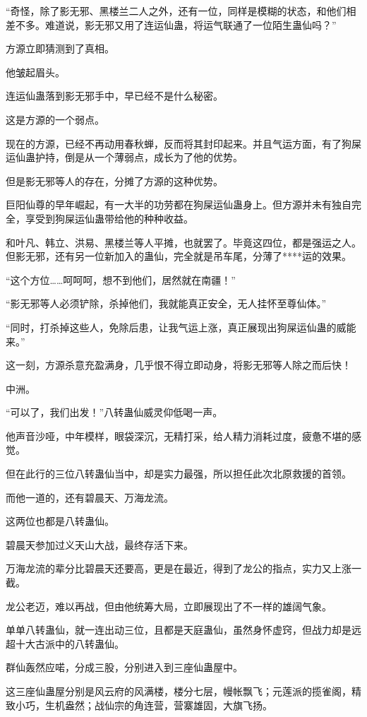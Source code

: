 \begin{this_body}
“奇怪，除了影无邪、黑楼兰二人之外，还有一位，同样是模糊的状态，和他们相差不多。难道说，影无邪又用了连运仙蛊，将运气联通了一位陌生蛊仙吗？”

方源立即猜测到了真相。

他皱起眉头。

连运仙蛊落到影无邪手中，早已经不是什么秘密。

这是方源的一个弱点。

现在的方源，已经不再动用春秋蝉，反而将其封印起来。并且气运方面，有了狗屎运仙蛊护持，倒是从一个薄弱点，成长为了他的优势。

但是影无邪等人的存在，分摊了方源的这种优势。

巨阳仙尊的早年崛起，有一大半的功劳都在狗屎运仙蛊身上。但方源并未有独自完全，享受到狗屎运仙蛊带给他的种种收益。

和叶凡、韩立、洪易、黑楼兰等人平摊，也就罢了。毕竟这四位，都是强运之人。但影无邪，还有另一位新加入的蛊仙，完全就是吊车尾，分薄了****运的效果。

“这个方位……呵呵呵，想不到他们，居然就在南疆！”

“影无邪等人必须铲除，杀掉他们，我就能真正安全，无人挂怀至尊仙体。”

“同时，打杀掉这些人，免除后患，让我气运上涨，真正展现出狗屎运仙蛊的威能来。”

这一刻，方源杀意充盈满身，几乎恨不得立即动身，将影无邪等人除之而后快！

中洲。

“可以了，我们出发！”八转蛊仙威灵仰低喝一声。

他声音沙哑，中年模样，眼袋深沉，无精打采，给人精力消耗过度，疲惫不堪的感觉。

但在此行的三位八转蛊仙当中，却是实力最强，所以担任此次北原救援的首领。

而他一道的，还有碧晨天、万海龙流。

这两位也都是八转蛊仙。

碧晨天参加过义天山大战，最终存活下来。

万海龙流的辈分比碧晨天还要高，更是在最近，得到了龙公的指点，实力又上涨一截。

龙公老迈，难以再战，但由他统筹大局，立即展现出了不一样的雄阔气象。

单单八转蛊仙，就一连出动三位，且都是天庭蛊仙，虽然身怀虚窍，但战力却是远超十大古派中的八转蛊仙。

群仙轰然应喏，分成三股，分别进入到三座仙蛊屋中。

这三座仙蛊屋分别是风云府的风满楼，楼分七层，幔帐飘飞；元莲派的揽雀阁，精致小巧，生机盎然；战仙宗的角连营，营寨雄固，大旗飞扬。


\end{this_body}

